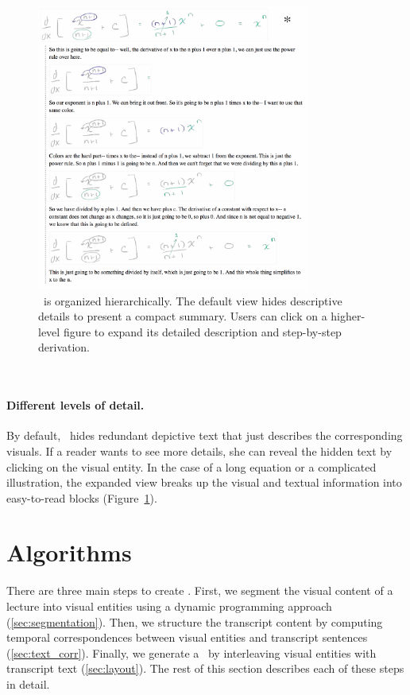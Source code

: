 \begin{figure}[h!]
        \centering
        \includegraphics[width=0.8\textwidth]{figures/videonote_expand.pdf}
	\captionsetup{font=footnotesize}
        \caption{\systemname\ is organized hierarchically. The default view hides descriptive details to present a compact summary. Users can click on a higher-level figure to expand its detailed description and step-by-step derivation.} 
        \label{Fig:videonote_expanded}
\end{figure}\\
%
\paragraph{Different levels of detail.} By default, \systemname\ hides redundant depictive text that just describes the corresponding visuals. If a reader wants to see more details, she can reveal the hidden text by clicking on the visual entity. In the case of a long equation or a complicated illustration, the expanded view breaks up the visual and textual information 
into easy-to-read blocks (Figure~\ref{Fig:videonote_expanded}). 

\section{Algorithms}
There are three main steps to create \systemname . First, we
segment the visual content of a lecture into visual entities using a
dynamic programming approach (\ref{sec:segmentation}). Then, we 
structure the transcript content by computing temporal correspondences
between visual entities and transcript sentences
(\ref{sec:text_corr}). Finally, we generate a \systemname\ by interleaving visual entities with transcript text (\ref{sec:layout}). The rest of this section describes each of these steps in detail.
%
